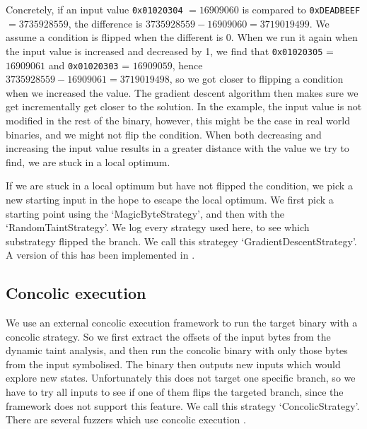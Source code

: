 Concretely, if an input value \texttt{0x01020304} $= 16909060$ is compared to \texttt{0xDEADBEEF} $= 3735928559$, the difference is $3735928559 - 16909060 = 3719019499$. We assume a condition is flipped when the different is $0$. When we run it again when the input value is increased and decreased by 1, we find that \texttt{0x01020305} = $16909061$ and \texttt{0x01020303} = $16909059$, hence $3735928559 - 16909061 = 3719019498$, so we got closer to flipping a condition when we increased the value. The gradient descent algorithm then makes sure we get incrementally get closer to the solution. In the example, the input value is not modified in the rest of the binary, however, this might be the case in real world binaries, and we might not flip the condition. When both decreasing and increasing the input value results in a greater distance with the value we try to find, we are stuck in a local optimum.

If we are stuck in a local optimum but have not flipped the condition, we pick a new starting input in the hope to escape the local optimum. We first pick a starting point using the `MagicByteStrategy', and then with the `RandomTaintStrategy'. We log every strategy used here, to see which substrategy flipped the branch.
We call this strategey `GradientDescentStrategy'. A version of this has been implemented in \cite{chen2018angora, shen2019neuro, she2019neuzz}.

\subsection{Concolic execution}
We use an external concolic execution framework to run the target binary with a concolic strategy. So we first extract the offsets of the input bytes from the dynamic taint analysis, and then run the concolic binary with only those bytes from the input symbolised. The binary then outputs new inputs which would explore new states. Unfortunately this does not target one specific branch, so we have to try all inputs to see if one of them flips the targeted branch, since the framework does not support this feature. We call this strategy `ConcolicStrategy'. There are several fuzzers which use concolic execution \cite{stephens2016driller, yun2018qsym, poeplau2020symbolic}.

